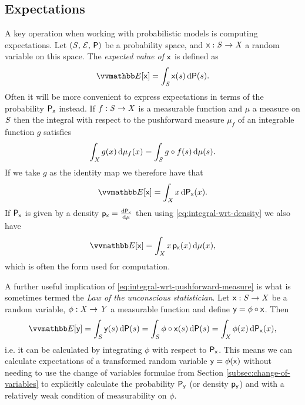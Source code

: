 \subsection{Expectations}\label{subsec:expectations}

A key operation when working with probabilistic models is computing expectations. Let $(\mathit{S},\,\mathcal{E},\,\mathsf{P})$ be a probability space, and $\mathsf{x} : \mathit{S} \to \mathit{X}$ a random variable on this space. The \emph{expected value of $\mathsf{x}$} is defined as
\begin{equation}\label{eq:expectation-general}
  \expc{\rvar{x}} = \int_{\set{S}} \rvar{x}(s) \,\dr\probability(s).
\end{equation}
Often it will be more convenient to express expectations in terms of the probability $\mathsf{P}_{\mathsf{x}}$ instead. If $f : \mathit{S} \to \mathit{X}$ is a measurable function and $\mu$ a measure on $\mathit{S}$ then the integral with respect to the pushforward measure $\mu_f$ of an integrable function $g$ satisfies
\begin{equation}\label{eq:integral-wrt-pushforward-measure}
  \int_{\mathit{X}} g(x) \,\mathrm{d}\mu_{f}(x) =
  \int_{\mathit{S}} g \circ f(s) \,\mathrm{d}\mu(s).
\end{equation}
If we take $g$ as the identity map we therefore have that
\begin{equation}\label{eq:expectation-pushfoward}
  \expc{\rvar{x}} = \int_{\set{X}} x \,\dr\prob{\rvar{x}}(x).
\end{equation}
If $\mathsf{P}_{\mathsf{x}}$ is given by a density $\mathsf{p}_{\mathsf{x}} = \frac{\mathrm{d} \mathsf{P}_{\mathsf{x}}}{\mathrm{d} \mu}$ then using \eqref{eq:integral-wrt-density} we also have
\begin{equation}\label{eq:expectation-density}
  \expc{\rvar{x}} = \int_{\set{X}} x \,\pden{\rvar{x}}(x) \,\dr\mu(x),
\end{equation}
which is often the form used for computation.

A further useful implication of \eqref{eq:integral-wrt-pushforward-measure} is what is sometimes termed the \emph{Law of the unconscious statistician}. Let $\mathsf{x} : \mathit{S} \to \mathit{X}$ be a random variable, $\phi : \mathit{X} \to \mathit{Y}$ a measurable function and define $\mathsf{y} = \phi \circ \mathsf{x}$. Then %
\begin{equation}\label{eq:law-of-the-unconscious-statistician}
  \expc{\rvar{y}} = \int_{\set{S}} \rvar{y}(s) \,\dr\probability(s)
  = \int_{\set{S}} \phi \circ \rvar{x}(s) \,\dr\probability(s)
  = \int_{\set{X}} \phi(x) \,\dr\prob{\rvar{x}}(x),
\end{equation}
i.e. it can be calculated by integrating $\phi$ with respect to $\mathsf{P}_{\mathsf{x}}$. This means we can calculate expectations of a transformed random variable $\mathsf{y} = \phi(\mathsf{x})$ without needing to use the change of variables formulae from Section \ref{subsec:change-of-variables} to explicitly calculate the probability $\mathsf{P}_{\mathsf{y}}$ (or density $\mathsf{p}_{\mathsf{y}}$) and with a relatively weak condition of measurability on $\phi$.

